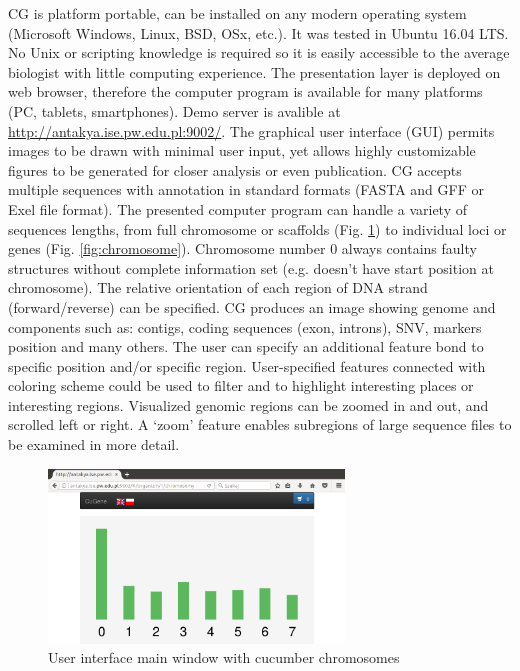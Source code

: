 \documentclass[]{spie}
\newcommand{\appShortcut}{CG}
\begin{document}
\appShortcut{} is platform portable, can be installed on any modern operating system (Microsoft Windows, Linux, BSD, OSx, etc.).
It was tested in Ubuntu 16.04 LTS.
No Unix or scripting knowledge is required so it is easily accessible to the average biologist with little computing experience.
The presentation layer is deployed on web browser, therefore the computer program is available for many platforms (PC, tablets, smartphones).
Demo server is avalible at \url{http://antakya.ise.pw.edu.pl:9002/}.
The graphical user interface (GUI) permits images to be drawn with minimal user input,
yet allows highly customizable figures to be generated for closer analysis or even publication.
\appShortcut{} accepts multiple sequences with annotation in standard formats (FASTA and GFF or Exel file format).
The presented computer program can handle a variety of sequences lengths, from full chromosome or scaffolds  (Fig. \ref{fig:organism})
to individual loci or genes (Fig. \ref{fig:chromosome}). Chromosome number 0 always contains faulty structures without complete information set (e.g. doesn't have start position at chromosome).
The relative orientation of each region of DNA strand (forward/reverse) can be specified.
\appShortcut{} produces an image showing genome and components such as: contigs, coding sequences (exon, introns), SNV, markers position and many others.
The user can specify an additional feature bond to specific position and/or specific region.
User-specified features connected with coloring scheme could be used to filter and to highlight interesting places or interesting regions.
Visualized genomic regions can be zoomed in and out, and scrolled left or right.
A ‘zoom’ feature enables subregions of large sequence files to be examined in more detail.

\begin{figure}[htp]
  \centering
  \includegraphics[width=0.7\textwidth]{img/chromosomy.png}
  \caption{User interface main window with cucumber chromosomes}
  \label{fig:organism}
\end{figure}
\end{document}
